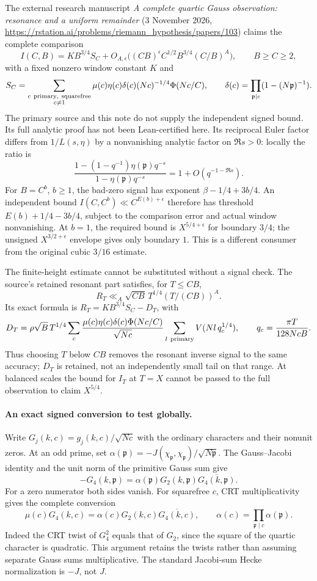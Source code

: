 \documentclass[11pt]{article}
\begin{document}
The external research manuscript
\emph{A complete quartic Gauss observation: resonance and a uniform
remainder} (3 November 2026,
\url{https://rstation.ai/problems/riemann_hypothesis/papers/103})
claims the complete comparison
\[
 I(C,B)=K B^{3/4}S_C+
 O_{A,\epsilon}\bigl((CB)^\epsilon C^{1/2}B^{3/4}(C/B)^A\bigr),
 \qquad B\ge C\ge2,
\]
with a fixed nonzero window constant \(K\) and
\[
 S_C=\sum_{\substack{c\ {\rm primary,\ squarefree}\\c\ne1}}
 \mu(c)\eta(c)\delta(c)(Nc)^{-1/4}\Phi(Nc/C),\qquad
 \delta(c)=\prod_{\mathfrak p\mid c}(1-(N\mathfrak p)^{-1}).
\]
The primary source and this note do not supply the independent signed
bound. Its full analytic proof has not been Lean-certified here.
Its reciprocal Euler factor differs from \(1/L(s,\eta)\) by a
nonvanishing analytic factor on \(\Re s>0\): locally the ratio is
\[
 \frac{1-(1-q^{-1})\eta(\mathfrak p)q^{-s}}
      {1-\eta(\mathfrak p)q^{-s}}=1+O(q^{-1-\Re s}).
\]
For \(B=C^b\), \(b\ge1\), the bad-zero signal has exponent
\(\beta-1/4+3b/4\). An independent bound \(I(C,C^b)\ll
C^{E(b)+\epsilon}\) therefore has threshold
\(E(b)+1/4-3b/4\), subject to the comparison error and actual window
nonvanishing. At \(b=1\), the required bound is \(X^{5/4+\epsilon}\)
for boundary \(3/4\); the unsigned \(X^{3/2+\epsilon}\) envelope gives
only boundary \(1\). This is a different consumer from the original
cubic \(3/16\) estimate.

The finite-height estimate cannot be substituted without a signal
check. The source's retained resonant part satisfies, for \(T\le CB\),
\[
 R_T\ll_A\sqrt{CB}\,T^{1/4}(T/(CB))^A.
\]
Its exact formula is \(R_T=K B^{3/4}S_C-D_T\), with
\[
 D_T=\rho\sqrt B\,T^{1/4}
 \sum_c\frac{\mu(c)\eta(c)\delta(c)\Phi(Nc/C)}{\sqrt{Nc}}
 \sum_{l\ {\rm primary}}V(Nl\,q_c^{1/4}),\qquad
 q_c=\frac{\pi T}{128NcB}.
\]
Thus choosing \(T\) below \(CB\) removes the resonant inverse signal
to the same accuracy; \(D_T\) is retained, not an independently small
tail on that range. At balanced scales the bound for \(I_T\) at \(T=X\)
cannot be passed to the full observation to claim \(X^{5/4}\).

\paragraph{An exact signed conversion to test globally.}
Write \(G_j(k,c)=g_j(k,c)/\sqrt{Nc}\) with the ordinary characters and
their nonunit zeros. At an odd prime, set
\(\alpha(\mathfrak p)=-J(\chi_{\mathfrak p},
\chi_{\mathfrak p})/\sqrt{N\mathfrak p}\).
The Gauss--Jacobi identity and the unit norm of the primitive Gauss sum
give
\[
 -G_4(k,\mathfrak p)=
 \alpha(\mathfrak p)G_2(k,\mathfrak p)
                    \overline{G_4(k,\mathfrak p)} .
\]
For a zero numerator both sides vanish. For squarefree \(c\), CRT
multiplicativity gives the complete conversion
\[
 \mu(c)G_4(k,c)=
 \alpha(c)G_2(k,c)\overline{G_4(k,c)},\qquad
 \alpha(c)=\prod_{\mathfrak p\mid c}\alpha(\mathfrak p).
\]
Indeed the CRT twist of \(G_4^2\) equals that of \(G_2\), since the
square of the quartic character is quadratic. This argument retains
the twists rather than assuming separate Gauss sums multiplicative.
The standard Jacobi-sum Hecke normalization is \(-J\), not \(J\).
\end{document}
